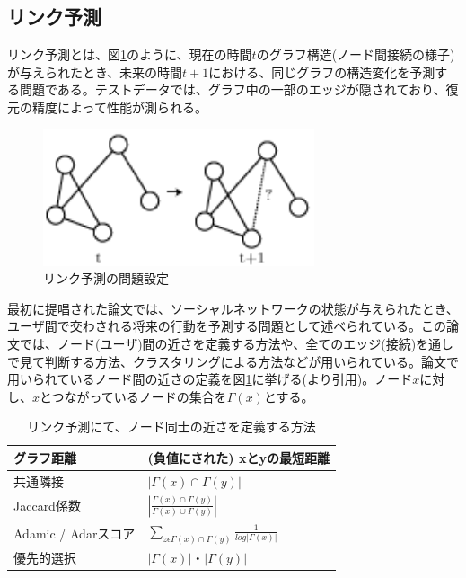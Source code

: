\subsection{リンク予測}
リンク予測とは、図\ref{c2_link_prediction}のように、現在の時間$t$のグラフ構造(ノード間接続の様子)が与えられたとき、未来の時間$t+1$における、同じグラフの構造変化を予測する問題である。テストデータでは、グラフ中の一部のエッジが隠されており、復元の精度によって性能が測られる。\par
\begin{figure}[tbp]
 \centering
  \includegraphics[width=80mm]{img/c2/link_prediction}
 \caption{リンク予測の問題設定}
 \label{c2_link_prediction}
\end{figure}
最初に提唱された論文\cite{liben-nowell2007the-link-prediction}では、ソーシャルネットワークの状態が与えられたとき、ユーザ間で交わされる将来の行動を予測する問題として述べられている。この論文では、ノード(ユーザ)間の近さを定義する方法や、全てのエッジ(接続)を通しで見て判断する方法、クラスタリングによる方法などが用いられている。論文で用いられているノード間の近さの定義を図\ref{c2_lp_method}に挙げる(\cite{liben-nowell2007the-link-prediction}より引用)。ノード$x$に対し、$x$とつながっているノードの集合を$\Gamma(x)$とする。\par
\begin{table}[tbp]
 \begin{center}
  \caption{リンク予測にて、ノード同士の近さを定義する方法}
  \begin{tabular}{|l|l|}\hline
  グラフ距離 & (負値にされた) xとyの最短距離 \\ \hline
  共通隣接 & $|\Gamma(x)∩\Gamma(y)|$ \\ \hline
  Jaccard係数 \cite{jaccard1902lois}& $\left| \frac{\Gamma(x)∩\Gamma(y)}{\Gamma(x)∪\Gamma(y)} \right|$ \\ \hline
  Adamic / Adarスコア \cite{adamic2003friends}& $\sum_{z\epsilon \Gamma(x)∩\Gamma(y)} \frac{1}{log|\Gamma(x)|}$ \\ \hline
  優先的選択 & $|\Gamma(x)|・|\Gamma(y)|$ \\ \hline
  \end{tabular}
 \end{center}
 \label{c2_lp_method}
\end{table}

